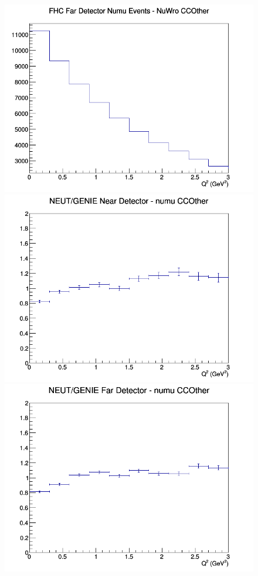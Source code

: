 \begin{figure}[h]
\endminipage
{}
\includegraphics[width=\linewidth]{eff_Q2/FGT/CCOther_FHC_FD_numu_Q2_NuWro.png}
\endminipage
\newline
{}
\includegraphics[width=\linewidth]{eff_Q2/FGT/ratios/CCOther_NEUT_GENIE_numu_near_Q2.png}
\endminipage
{}
\includegraphics[width=\linewidth]{eff_Q2/FGT/ratios/CCOther_NEUT_GENIE_numu_far_Q2.png}

\end{figure}
